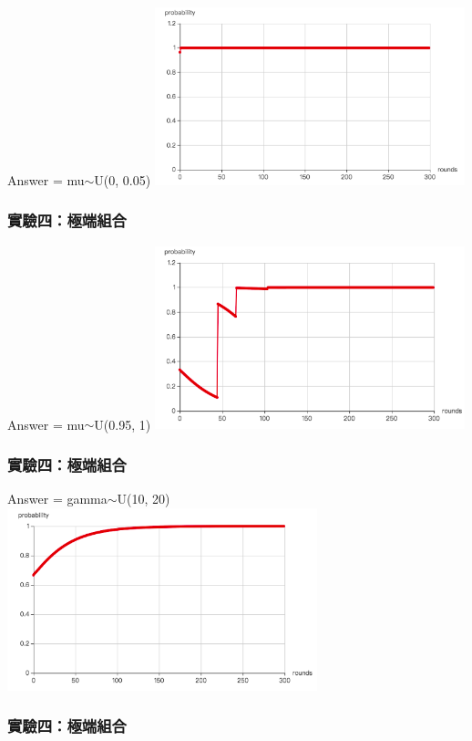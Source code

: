\documentclass[12pt,a4paper]{beamer}
\begin{document}
\begin{CJK}{UTF8}{bsmi}
\begin{frame}
Answer = mu$\sim$U(0, 0.05)
\centering\includegraphics[width=90mm,scale=0.7]{exp4-1}

\end{frame}

\begin{frame}
\frametitle{實驗四：極端組合}

Answer = mu$\sim$U(0.95, 1)
\centering\includegraphics[width=90mm,scale=0.7]{exp4-2}

\end{frame}

\begin{frame}
\frametitle{實驗四：極端組合}

Answer = gamma$\sim$U(10, 20)
\centering\includegraphics[width=90mm,scale=0.7]{exp4-3}

\end{frame}

\begin{frame}
\frametitle{實驗四：極端組合}


\end{frame}
\end{CJK}
\end{document}

